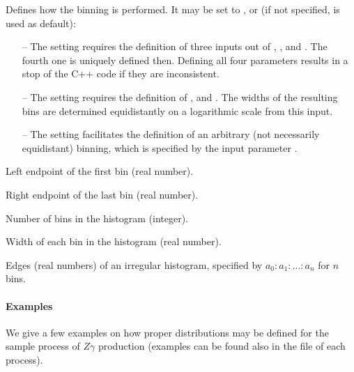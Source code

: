 \documentclass[english,11pt]{article}
\begin{document}
\quad Defines how the binning is performed. It may be set to 
,  or  (if not specified,  is used as default):
\vspace{-0.5cm}\begin{itemize}[leftmargin=*]
\setlength\itemsep{-0.3em}
\item[--] The setting  requires the definition of three inputs out of , , 
 and . The fourth one is uniquely defined then. Defining all four parameters 
results in a stop of the C++ code if they are inconsistent.
\item[--] The setting  requires the definition of ,  and .
The widths of the resulting bins are determined equidistantly on a logarithmic scale from this input.
\item[--] The setting  facilitates the definition of an arbitrary (not necessarily equidistant) binning, which is specified by the input parameter
.
\end{itemize}
\vspace{-0.32cm}
\quad Left endpoint of the first bin (real number).

\quad Right endpoint of the last bin (real number).

\quad Number of bins in the histogram (integer).

\quad Width of each bin in the histogram (real number).

\quad Edges (real numbers) of an irregular histogram, specified by $a_0:a_1:\dots:a_n$ for $n$ bins.



\paragraph{Examples}

We give a few examples on how proper distributions may be defined for the sample process of $Z\gamma$ production 
(examples can be found also in the file  of each process).
\end{document}
